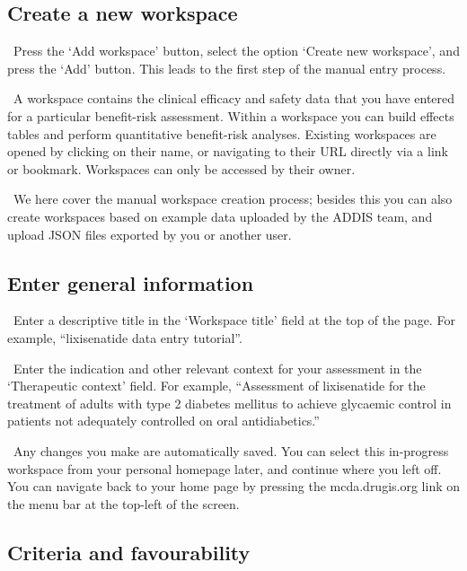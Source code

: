 \documentclass[00_mcda_tutorial.tex]{subfiles}
\begin{document}
\subsection*{Create a new workspace}
\leftpointright \, Press the ‘Add workspace’ button, select the option ‘Create new workspace’, and press the ‘Add’ button. This leads to the first step of the manual entry process.
\newline

\noindent \faGraduationCap \, A workspace contains the clinical efficacy and safety data that you have entered for a particular benefit-risk assessment. Within a workspace you can build effects tables and perform quantitative benefit-risk analyses. Existing workspaces are opened by clicking on their name, or navigating to their URL directly via a link or bookmark. Workspaces can only be accessed by their owner.
\newline

\noindent \faLightbulbO \, We here cover the manual workspace creation process; besides this you can also create workspaces based on example data uploaded by the ADDIS team, and upload JSON files exported by you or another user.

\subsection*{Enter general information}
\noindent \leftpointright \, Enter a descriptive title in the ‘Workspace title’ field at the top of the page. For example, “lixisenatide data entry tutorial”.
\newline

\noindent \leftpointright \, Enter the indication and other relevant context for your assessment in the ‘Therapeutic context’ field. For example, “Assessment of lixisenatide for the treatment of adults with type 2 diabetes mellitus to achieve glycaemic control in patients not adequately controlled on oral antidiabetics.”
\newline

\noindent \faLightbulbO \, Any changes you make are automatically saved. You can select this in-progress workspace from your personal homepage later, and continue where you left off. You can navigate back to your home page by pressing the mcda.drugis.org link on the menu bar at the top-left of the screen.

\subsection*{Criteria and favourability}
\end{document}
